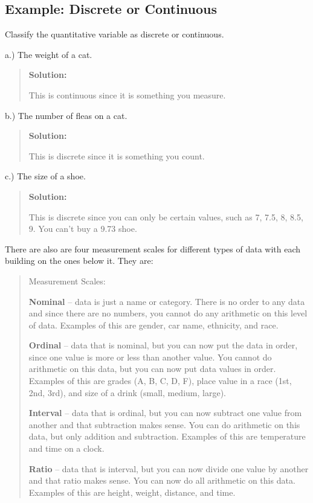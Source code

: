 \documentclass[]{book}
\begin{document}
\hypertarget{example-discrete-or-continuous}{%
\subsection{Example: Discrete or Continuous}\label{example-discrete-or-continuous}}

Classify the quantitative variable as discrete or continuous.

a.) The weight of a cat.

\begin{quote}
\textbf{Solution:}

This is continuous since it is something you measure.
\end{quote}

b.) The number of fleas on a cat.

\begin{quote}
\textbf{Solution:}

This is discrete since it is something you count.
\end{quote}

c.) The size of a shoe.

\begin{quote}
\textbf{Solution:}

This is discrete since you can only be certain values, such as 7, 7.5, 8, 8.5, 9. You can't buy a 9.73 shoe.
\end{quote}

There are also are four measurement scales for different types of data with each building on the ones below it. They are:

\begin{quote}
Measurement Scales:

\textbf{Nominal} -- data is just a name or category. There is no order to any data and since there are no numbers, you cannot do any arithmetic on this level of data. Examples of this are gender, car name, ethnicity, and race.

\textbf{Ordinal} -- data that is nominal, but you can now put the data in order, since one value is more or less than another value. You cannot do arithmetic on this data, but you can now put data values in order. Examples of this are grades (A, B, C, D, F), place value in a race (1st, 2nd, 3rd), and size of a drink (small, medium, large).

\textbf{Interval} -- data that is ordinal, but you can now subtract one value from another and that subtraction makes sense. You can do arithmetic on this data, but only addition and subtraction. Examples of this are temperature and time on a clock.

\textbf{Ratio} -- data that is interval, but you can now divide one value by another and that ratio makes sense. You can now do all arithmetic on this data. Examples of this are height, weight, distance, and time.
\end{quote}
\end{document}
